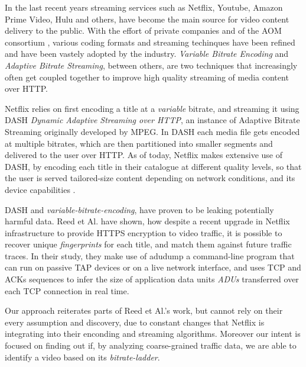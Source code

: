 
In the last recent years streaming services such as Netflix, Youtube, Amazon
Prime Video, Hulu and others, have become the main source for video content
delivery to the public. With the effort of private companies and of the AOM
consortium \cite{aom}, various coding formats and streaming techinques have
been refined and have been vastely adopted by the industry.  \emph{Variable
Bitrate Encoding} and \emph{Adaptive Bitrate Streaming}, between others, are
two techniques that increasingly often get coupled together to improve high
quality streaming of media content over HTTP.

Netflix relies on first encoding a title at a \emph{variable} bitrate, and
streaming it using DASH \textit{Dynamic Adaptive Streaming over HTTP}, an
instance of Adaptive Bitrate Streaming originally developed by MPEG. In DASH
each media file gets encoded at multiple bitrates, which are then partitioned
into smaller segments and delivered to the user over HTTP. As of today, Netflix
makes extensive use of DASH, by encoding each title in their catalogue at
different quality levels, so that the user is served tailored-size content
depending on network conditions, and its device capabilities
\cite{per-title-encoding}.

DASH and \emph{variable-bitrate-encoding}, have proven to be leaking
potentially harmful data. Reed et Al. \cite{netflix-real-time} have shown, how
despite a recent upgrade in Netflix infrastructure to provide HTTPS encryption
to video traffic, it is possible to recover unique \emph{fingerprints} for each
title, and match them against future traffic traces. In their study, they make
use of adudump \cite{adudump} a command-line program that can run on passive
TAP devices \cite{tap} or on a live network interface, and uses TCP and ACKs
sequences to infer the size of application data units \emph{ADUs} transferred
over each TCP connection in real time.

Our approach reiterates parts of Reed et Al.'s work, but cannot rely on their
every assumption and discovery, due to constant changes that Netflix is
integrating into their enconding and streaming algorithms. Moreover our intent
is focused on finding out if, by analyzing coarse-grained traffic data, we are
able to identify a video based on its \emph{bitrate-ladder}.

